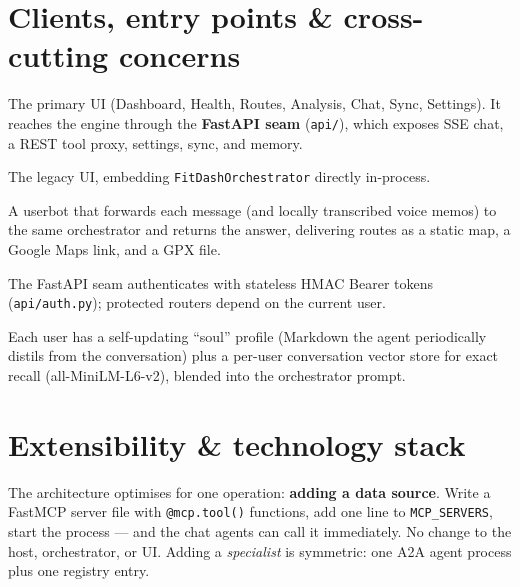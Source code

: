 \documentclass[11pt,a4paper]{article}
\newcommand{\code}[1]{{\small\texttt{#1}}}
\begin{document}
\section{Clients, entry points \& cross-cutting concerns}
\begin{description}[style=unboxed,leftmargin=0em,itemsep=2pt]
  \item[React / Vite web app (\code{web/}).] The primary UI (Dashboard, Health, Routes,
    Analysis, Chat, Sync, Settings). It reaches the engine through the \textbf{FastAPI seam}
    (\code{api/}), which exposes SSE chat, a REST tool proxy, settings, sync, and memory.
  \item[Streamlit app (\code{app.py}).] The legacy UI, embedding \code{FitDashOrchestrator}
    directly in-process.
  \item[Telegram bridge (\code{telegram\_bridge.py}).] A userbot that forwards each message
    (and locally transcribed voice memos) to the same orchestrator and returns the answer,
    delivering routes as a static map, a Google Maps link, and a GPX file.
  \item[Identity \& auth.] The FastAPI seam authenticates with stateless HMAC Bearer tokens
    (\code{api/auth.py}); protected routers depend on the current user.
  \item[Per-user memory.] Each user has a self-updating ``soul'' profile (Markdown the agent
    periodically distils from the conversation) plus a per-user conversation vector store for
    exact recall (all-MiniLM-L6-v2), blended into the orchestrator prompt.
\end{description}

\section{Extensibility \& technology stack}
The architecture optimises for one operation: \textbf{adding a data source}. Write a FastMCP
server file with \code{@mcp.tool()} functions, add one line to \code{MCP\_SERVERS}, start the
process --- and the chat agents can call it immediately. No change to the host, orchestrator,
or UI. Adding a \emph{specialist} is symmetric: one A2A agent process plus one registry entry.
\end{document}
